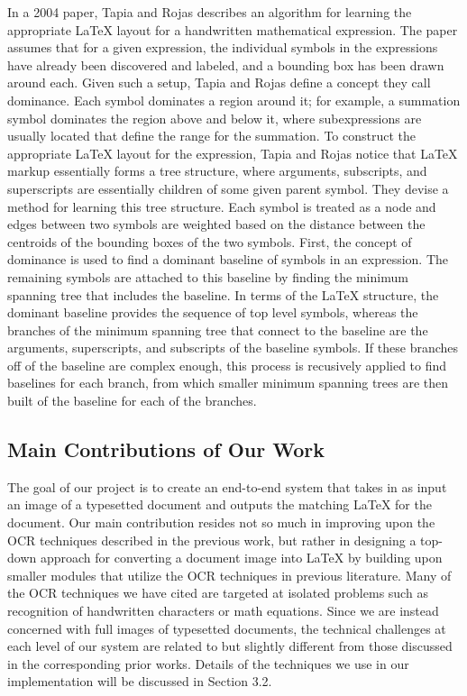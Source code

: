 \documentclass[12pt]{IEEEtran}
\newcommand{\latex}{\LaTeX\xspace}
\begin{document}
In a 2004 paper, Tapia and Rojas describes an algorithm for learning the appropriate \latex layout for a handwritten mathematical expression. The paper assumes that for a given expression, the individual symbols in the expressions have already been discovered and labeled, and a bounding box has been drawn around each. Given such a setup, Tapia and Rojas define a concept they call dominance. Each symbol dominates a region around it; for example, a summation symbol dominates the region above and below it, where subexpressions are usually located that define the range for the summation. To construct the appropriate \latex layout for the expression, Tapia and Rojas notice that \latex markup essentially forms a tree structure, where arguments, subscripts, and superscripts are essentially children of some given parent symbol. They devise a method for learning this tree structure. Each symbol is treated as a node and edges between two symbols are weighted based on the distance between the centroids of the bounding boxes of the two symbols. First, the concept of dominance is used to find a dominant baseline of symbols in an expression. The remaining symbols are attached to this baseline by finding the minimum spanning tree that includes the baseline. In terms of the \latex structure, the dominant baseline provides the sequence of top level symbols, whereas the branches of the minimum spanning tree that connect to the baseline are the arguments, superscripts, and subscripts of the baseline symbols. If these branches off of the baseline are complex enough, this process is recusively applied to find baselines for each branch, from which smaller minimum spanning trees are then built of the baseline for each of the branches.

\subsection{Main Contributions of Our Work}
The goal of our project is to create an end-to-end system that takes in as input an image of a typesetted document and outputs the matching \latex for the document. Our main contribution resides not so much in improving upon the OCR techniques described in the previous work, but rather in designing a top-down approach for converting a document image into \latex by building upon smaller modules that utilize the OCR techniques in previous literature. Many of the OCR techniques we have cited are targeted at isolated problems such as recognition of handwritten characters or math equations. Since we are instead concerned with full images of typesetted documents, the technical challenges at each level of our system are related to but slightly different from those discussed in the corresponding prior works. Details of the techniques we use in our implementation will be discussed in Section 3.2.
\end{document}
